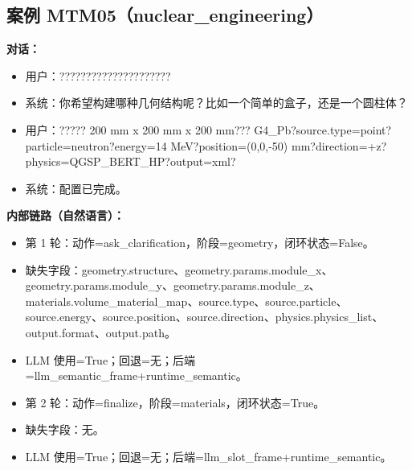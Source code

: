 \documentclass[11pt]{ctexart}
\begin{document}
\subsection{案例 MTM05（nuclear\_engineering）}
\textbf{对话：}
\begin{itemize}
\item 用户：?????????????????????
\item 系统：你希望构建哪种几何结构呢？比如一个简单的盒子，还是一个圆柱体？
\item 用户：????? 200 mm x 200 mm x 200 mm??? G4\_Pb?source.type=point?particle=neutron?energy=14 MeV?position=(0,0,-50) mm?direction=+z?physics=QGSP\_BERT\_HP?output=xml?
\item 系统：配置已完成。
\end{itemize}
\textbf{内部链路（自然语言）：}
\begin{itemize}
\item 第 1 轮：动作=ask\_clarification，阶段=geometry，闭环状态=False。
\item 缺失字段：geometry.structure、geometry.params.module\_x、geometry.params.module\_y、geometry.params.module\_z、materials.volume\_material\_map、source.type、source.particle、source.energy、source.position、source.direction、physics.physics\_list、output.format、output.path。
\item LLM 使用=True；回退=无；后端=llm\_semantic\_frame+runtime\_semantic。
\item 第 2 轮：动作=finalize，阶段=materials，闭环状态=True。
\item 缺失字段：无。
\item LLM 使用=True；回退=无；后端=llm\_slot\_frame+runtime\_semantic。
\end{itemize}
\end{document}
